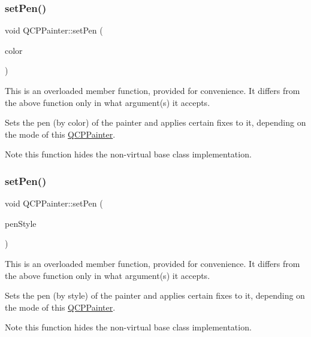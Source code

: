 \subsubsection{\texorpdfstring{set\+Pen()}{setPen()}\hspace{0.1cm}{\footnotesize\ttfamily [2/3]}}
{\footnotesize\ttfamily void Q\+C\+P\+Painter\+::set\+Pen (\begin{DoxyParamCaption}\item[{const Q\+Color \&}]{color }\end{DoxyParamCaption})}

This is an overloaded member function, provided for convenience. It differs from the above function only in what argument(s) it accepts.

Sets the pen (by color) of the painter and applies certain fixes to it, depending on the mode of this \hyperlink{class_q_c_p_painter}{Q\+C\+P\+Painter}.

\begin{DoxyNote}{Note}
this function hides the non-\/virtual base class implementation. 
\end{DoxyNote}
\mbox{\label{class_q_c_p_painter_a25e76095aae41da0d08035060e5f81ca}} 
\subsubsection{\texorpdfstring{set\+Pen()}{setPen()}\hspace{0.1cm}{\footnotesize\ttfamily [3/3]}}
{\footnotesize\ttfamily void Q\+C\+P\+Painter\+::set\+Pen (\begin{DoxyParamCaption}\item[{Qt\+::\+Pen\+Style}]{pen\+Style }\end{DoxyParamCaption})}

This is an overloaded member function, provided for convenience. It differs from the above function only in what argument(s) it accepts.

Sets the pen (by style) of the painter and applies certain fixes to it, depending on the mode of this \hyperlink{class_q_c_p_painter}{Q\+C\+P\+Painter}.

\begin{DoxyNote}{Note}
this function hides the non-\/virtual base class implementation. 
\end{DoxyNote}


